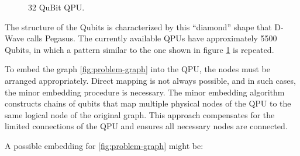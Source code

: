 \begin{figure}[H]
\begin{center}
      \caption{32 QuBit QPU.}
      \label{fig:QPU}
  \end{center}
\end{figure}

The structure of the Qubits is characterized by this ``diamond'' shape that D-Wave calls Pegasus. The currently available QPUs have approximately 5500 Qubits, in which a pattern similar to the one shown in figure \ref{fig:QPU} is repeated.

To embed the graph \ref{fig:problem-graph} into the QPU, the nodes must be arranged appropriately. Direct mapping is not always possible, and in such cases, the minor embedding procedure\cite{ME} is necessary. The minor embedding algorithm constructs chains of qubits that map multiple physical nodes of the QPU to the same logical node of the original graph. This approach compensates for the limited connections of the QPU and ensures all necessary nodes are connected.

A possible embedding for \ref{fig:problem-graph} might be:

